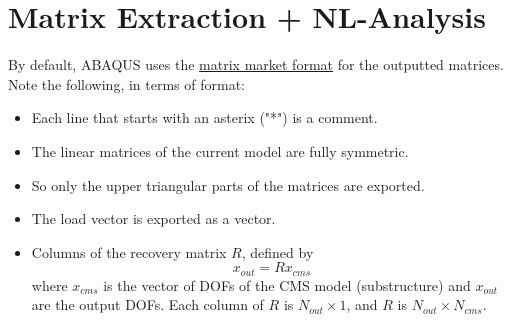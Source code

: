 \documentclass[11pt]{article}
\begin{document}
\section{Matrix Extraction + NL-Analysis}
\label{sec:mex}
By default, ABAQUS uses the \href{https://math.nist.gov/MatrixMarket/}{matrix market format} for the outputted matrices.
Note the following, in terms of format:
\begin{itemize}
\item Each line that starts with an asterix ("*") is a comment.
\item The linear matrices of the current model are fully symmetric.
\item So only the upper triangular parts of the matrices are exported.
\item The load vector is exported as a vector.
\item Columns of the recovery matrix \(R\), defined by
$$ x_{out} = R x_{cms} $$
where \(x_{cms}\) is the vector of DOFs of the CMS model (substructure) and \(x_{out}\) are the output DOFs.
Each column of \(R\) is \(N_{out}\times 1\), and \(R\) is \(N_{out}\times N_{cms}\).
\end{itemize}
\end{document}
